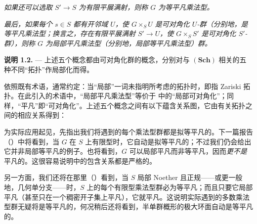 \textit{如果还可以选取 \(S'\to S\) 为有限平展满射，则称 \(G\) 为\emph{等平凡乘法型}。}

\textit{最后，如果每个 \(s\in S\) 都有开邻域 \(U\)，使 \(G\times_S U\) 是可对角化 \(U\)-群（分别地，是等平凡乘法型；换言之，存在有限平展满射 \(S'\to U\)，使 \(G\times_S S'\) 是可对角化 \(S'\)-群），则称 \(G\) 为\emph{局部平凡乘法型}（分别地，\emph{局部等平凡乘法型}）群。}

\medskip
\noindent{}\textbf{说明 1.2.} ---
上述五个概念都由可对角化群的概念，分别对与 \((\mathbf{Sch})\) 相关的五种不同“拓扑”作局部化而得。

依照既有术语，通常约定：当“局部”一词未指明所考虑的拓扑时，即指 Zariski 拓扑。在此引入的术语中，“局部平凡乘法型”等价于  中的“局部可对角化”；同样，“平凡”即“可对角化”。上述五个概念之间有以下蕴含关系图，它由有关拓扑之间的相应关系得到：

\begin{center}
\end{center}

为实际应用起见，先指出我们将遇到的每个乘法型群都是拟等平凡的。下一篇报告（）中将看到，当 \(G\) 在 \(S\) 上有限型时，它自动是拟等平凡的；不过我们仍会给出它并非局部等平凡的例子。也将看到，\(G\) 可以局部平凡而非等平凡，因而\emph{更不是}平凡的。这很容易说明中的包含关系都是严格的。

另一方面，我们还将在那里（）看到，当 \(S\) 局部 Noether 且正规——或更一般地，几何单分支——时，\(S\) 上的每个有限型乘法型群必为等平凡；而且只要它局部平凡（甚至只在一个稠密开子集上平凡），它就平凡。这说明实际遇到的多数乘法型群无疑将是等平凡的，何况稍后还将看到，半单群概形的极大环面自动是等平凡的。

